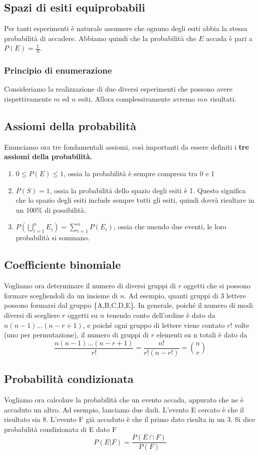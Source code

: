 \documentclass[11pt]{article}
\begin{document}
\subsection{Spazi di esiti equiprobabili}
Per tanti esperimenti è naturale assumere che ognuno degli esiti abbia la stessa probabilità di accadere. Abbiamo quindi che la probabilità che $E$ accada è pari a $P(E)=\frac{1}{N}$.
\subsubsection{Principio di enumerazione}
Consideriamo la realizzazione di due diversi esperimenti che possono avere rispettivamente $m$ ed $n$ esiti. Allora complessivamente avremo $mn$ risultati.
\subsection{Assiomi della probabilità}
Enunciamo ora tre fondamentali assiomi, così importanti da essere definiti i \textbf{tre assiomi della probabilità.}
\begin{enumerate}
    \item $0\le P(E) \le 1$, ossia la probabilità è sempre compresa tra 0 e 1
    \item $P(S)=1$, ossia la probabilità dello spazio degli esiti è 1. Questo significa che lo spazio degli esiti include sempre tutti gli esiti, quindi dovrà risultare in un 100\% di possibilità.
    \item $P\left(\bigcup_{i=1}^n E_i\right) = \sum_{i=1}^n P(E_i)$, ossia che unendo due eventi, le loro probabilità si sommano.
\end{enumerate}
\subsection{Coefficiente binomiale}
Vogliamo ora determinare il numero di diversi gruppi di $r$ oggetti che si possono formare scegliendoli da un insieme di $n$. Ad esempio, quanti gruppi di 3 lettere possono formarsi dal gruppo \{A,B,C,D,E\}. In generale, poiché il numero di modi diversi di scegliere $r$ oggetti su $n$ tenendo conto dell'ordine è dato da $n(n-1)...(n-r+1)$, e poiché ogni gruppo di lettere viene contato $r!$ volte (uno per permutazione), il numero di gruppi di $r$ elementi su n totali è dato da
\begin{displaymath}
    \frac{n(n-1)...(n-r+1)}{r!} = \frac{n!}{r!(n-r!)} = {n\choose r}
\end{displaymath}
\subsection{Probabilità condizionata}
Vogliamo ora calcolare la probabilità che un evento accada, appurato che ne è accaduto un altro. Ad esempio, lanciamo due dadi. L'evento E cercato è che il risultato sia 8. L'evento F già accaduto è che il primo dato risulta in un 3. Si dice probabilità condizionata di E dato F
\begin{displaymath}
    P(E|F) = \frac{P(E\cap F)}{P(F)}
\end{displaymath}
\end{document}
